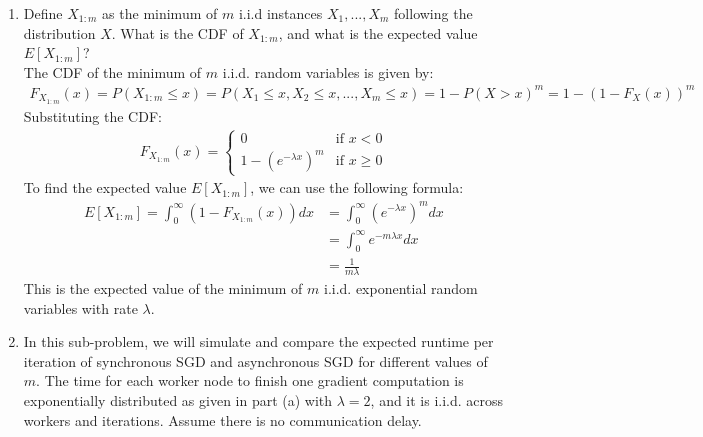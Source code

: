 \documentclass[a3paper,12pt]{extarticle} %
\begin{document}
\begin{enumerate}
\item
Define $X_{1:m}$ as the minimum of $m$ i.i.d instances $X_1, ..., X_m$ following the distribution $X$. What is the CDF of $X_{1:m}$, and what is the expected value $E[X_{1:m}]$?
\\ The CDF of the minimum of $m$ i.i.d. random variables is given by:
\begin{align}
F_{X_{1:m}}(x) = P(X_{1:m} \leq x) = P(X_1 \leq x, X_2 \leq x, ..., X_m \leq x) = 1 - P(X > x)^m = 1 - (1 - F_X(x))^m
\end{align}
Substituting the CDF:
\begin{align}
F_{X_{1:m}}(x) =
\begin{cases}
0 & \text{if } x < 0\\
1 - (e^{-\lambda x})^m & \text{if } x \geq 0
\end{cases}
\end{align}
To find the expected value $E[X_{1:m}]$, we can use the following formula:
\begin{align}
E[X_{1:m}] = \int_0^\infty (1 - F_{X_{1:m}}(x)) dx
&= \int_0^\infty (e^{-\lambda x})^m dx\\
&= \int_0^\infty e^{-m\lambda x} dx\\
&= \frac{1}{m\lambda}
\end{align}
This is the expected value of the minimum of $m$ i.i.d. exponential random variables with rate $\lambda$.


\item
In this sub-problem, we will simulate and compare the expected runtime per iteration of synchronous SGD and asynchronous SGD for different values of $m$. The time for each worker node to finish one gradient computation is exponentially distributed as given in part (a) with $\lambda = 2$, and it is i.i.d. across workers and iterations. Assume there is no communication delay.


\end{enumerate}
\end{document}
